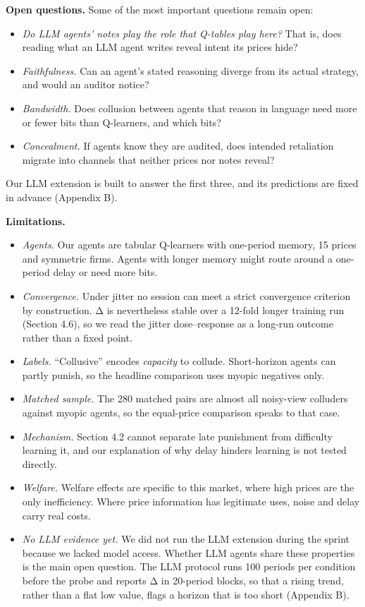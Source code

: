 \documentclass[11pt,a4paper]{article}
\providecommand{\tightlist}{\setlength{\itemsep}{1pt}\setlength{\parskip}{0pt}}
\begin{document}
\textbf{Open questions.} Some of the most important questions remain open:

\begin{itemize}
\tightlist
\item
  \emph{Do LLM agents' notes play the role that Q-tables play here?} That is, does reading what an LLM agent writes reveal intent its prices hide?
\item
  \emph{Faithfulness.} Can an agent's stated reasoning diverge from its actual strategy, and would an auditor notice?
\item
  \emph{Bandwidth.} Does collusion between agents that reason in language need more or fewer bits than Q-learners, and which bits?
\item
  \emph{Concealment.} If agents know they are audited, does intended retaliation migrate into channels that neither prices nor notes reveal?
\end{itemize}

Our LLM extension is built to answer the first three, and its predictions are fixed in advance (Appendix B).

\textbf{Limitations.}

\begin{itemize}
\tightlist
\item
  \emph{Agents.} Our agents are tabular Q-learners with one-period memory, 15 prices and symmetric firms. Agents with longer memory might route around a one-period delay or need more bits.
\item
  \emph{Convergence.} Under jitter no session can meet a strict convergence criterion by construction. Δ is nevertheless stable over a 12-fold longer training run (Section 4.6), so we read the jitter dose--response as a long-run outcome rather than a fixed point.
\item
  \emph{Labels.} ``Collusive'' encodes \emph{capacity} to collude. Short-horizon agents can partly punish, so the headline comparison uses myopic negatives only.
\item
  \emph{Matched sample.} The 280 matched pairs are almost all noisy-view colluders against myopic agents, so the equal-price comparison speaks to that case.
\item
  \emph{Mechanism.} Section 4.2 cannot separate late punishment from difficulty learning it, and our explanation of why delay hinders learning is not tested directly.
\item
  \emph{Welfare.} Welfare effects are specific to this market, where high prices are the only inefficiency. Where price information has legitimate uses, noise and delay carry real costs.
\item
  \emph{No LLM evidence yet.} We did not run the LLM extension during the sprint because we lacked model access. Whether LLM agents share these properties is the main open question. The LLM protocol runs 100 periods per condition before the probe and reports Δ in 20-period blocks, so that a rising trend, rather than a flat low value, flags a horizon that is too short (Appendix B).
\end{itemize}
\end{document}
